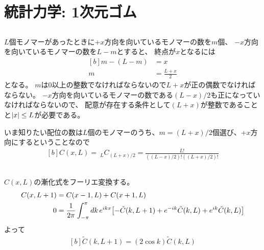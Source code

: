 \documentclass[../../sp_2014.tex]{subfiles}
\begin{document}
\section{統計力学: 1次元ゴム}
\subsection{}
\(L\)個モノマーがあったときに\(+x\)方向を向いているモノマーの数を\(m\)個、
\(-x\)方向を向いているモノマーの数を\(L-m\)とすると、
終点が\(x\)となるには
\begin{equation}\begin{aligned}[b]
    m-(L-m)&=x\\
    m &= \frac{L+x}{2}
\end{aligned}\end{equation}
となる。
\(m\)は0以上の整数でなければならないので\(L+x\)が正の偶数でなければならない。
\(-x\)方向を向いているモノマーの数である\((L-x)/2\)も正になっていなければならないので、
配意が存在する条件として\((L+x)\)が整数であることと\(\abs{x}\leq L\)が必要である。

いま知りたい配位の数は\(L\)個のモノマーのうち、\(m=(L+x)/2\)個選び、\(+x\)方向にするということなので
\begin{equation}\begin{aligned}[b]
    C(x,L)=~_{L}C_{(L+x)/2} = \frac{L!}{((L-x)/2)!((L+x)/2)!}
\end{aligned}\end{equation}

\subsection{}
\(C(x,L)\)の漸化式をフーリエ変換する。
\begin{equation}\begin{aligned}[b]
    C(x,L+1) &= C(x-1, L)+C(x+1,L)\\
    0&= \frac{1}{2\pi}\int_{-\pi}^{\pi}dk\,e^{ikx}\qty[-\tilde{C}(k,L+1)+e^{-ik}\tilde{C}(k,L)+e^{ik}\tilde{C}(k,L)]
\end{aligned}\end{equation}
よって
\begin{equation}\begin{aligned}[b]
    \tilde{C}(k,L+1) = (2\cos k) \tilde{C}(k,L)
\end{aligned}\end{equation}
\end{document}
